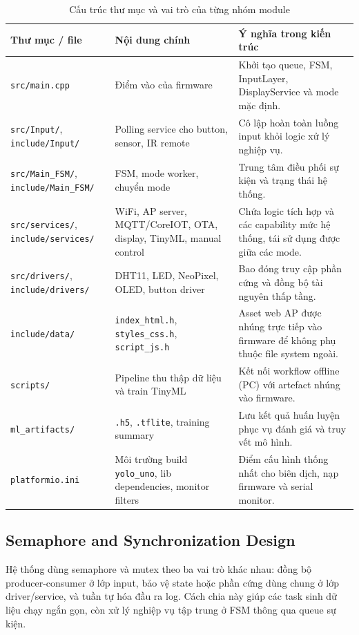 \begin{table}[H]
\centering
\small
\begin{tabular}{|p{3.0cm}|p{4.8cm}|p{6.6cm}|}
\hline
\textbf{Thư mục / file} & \textbf{Nội dung chính} & \textbf{Ý nghĩa trong kiến trúc} \\
\hline
\texttt{src/main.cpp} & Điểm vào của firmware & Khởi tạo queue, FSM, InputLayer, DisplayService và mode mặc định. \\
\hline
\texttt{src/Input/}, \texttt{include/Input/} & Polling service cho button, sensor, IR remote & Cô lập hoàn toàn luồng input khỏi logic xử lý nghiệp vụ. \\
\hline
\texttt{src/Main\_FSM/}, \texttt{include/Main\_FSM/} & FSM, mode worker, chuyển mode & Trung tâm điều phối sự kiện và trạng thái hệ thống. \\
\hline
\texttt{src/services/}, \texttt{include/services/} & WiFi, AP server, MQTT/CoreIOT, OTA, display, TinyML, manual control & Chứa logic tích hợp và các capability mức hệ thống, tái sử dụng được giữa các mode. \\
\hline
\texttt{src/drivers/}, \texttt{include/drivers/} & DHT11, LED, NeoPixel, OLED, button driver & Bao đóng truy cập phần cứng và đồng bộ tài nguyên thấp tầng. \\
\hline
\texttt{include/data/} & \texttt{index\_html.h}, \texttt{styles\_css.h}, \texttt{script\_js.h} & Asset web AP được nhúng trực tiếp vào firmware để không phụ thuộc file system ngoài. \\
\hline
\texttt{scripts/} & Pipeline thu thập dữ liệu và train TinyML & Kết nối workflow offline (PC) với artefact nhúng vào firmware. \\
\hline
\texttt{ml\_artifacts/} & \texttt{.h5}, \texttt{.tflite}, training summary & Lưu kết quả huấn luyện phục vụ đánh giá và truy vết mô hình. \\
\hline
\texttt{platformio.ini} & Môi trường build \texttt{yolo\_uno}, lib dependencies, monitor filters & Điểm cấu hình thống nhất cho biên dịch, nạp firmware và serial monitor. \\
\hline
\end{tabular}
\caption{Cấu trúc thư mục và vai trò của từng nhóm module}
\label{tab:project-structure}
\end{table}

\subsection{Semaphore and Synchronization Design}
Hệ thống dùng semaphore và mutex theo ba vai trò khác nhau: đồng bộ producer-consumer ở lớp input, bảo vệ state hoặc phần cứng dùng chung ở lớp driver/service, và tuần tự hóa đầu ra log. Cách chia này giúp các task sinh dữ liệu chạy ngắn gọn, còn xử lý nghiệp vụ tập trung ở FSM thông qua queue sự kiện.

